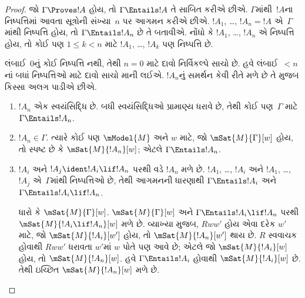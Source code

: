 \begin{proof}
  જો $\Gamma \Proves !A$ હોય, તો $\Gamma \Entails !A$
  તે સાબિત કરીએ છીએ. $\Gamma$માંથી~$!A$ના નિષ્પત્તિમાં
  આવતા સૂત્રોની સંખ્યા~$n$ પર આગમન કરીએ છીએ.
  $!A_1$, \dots, $!A_n = !A$ એ~$\Gamma$માંથી
  નિષ્પત્તિ હોય, તો $\Gamma \Entails !A_n$ છે તે બતાવીએ.
  નોંધો કે $!A_1$, \dots, $!A_n$ એ નિષ્પત્તિ હોય,
  તો કોઈ પણ $1\le k<n$ માટે $!A_1$, \dots, $!A_k$ પણ
  નિષ્પત્તિ છે.
  

  લંબાઈ~$0$નું કોઈ નિષ્પત્તિ નથી, તેથી $n=0$ માટે
  દાવો નિર્વિકલ્પે સાચો છે. હવે લંબાઈ~$<n$નાં બધાં
  નિષ્પત્તિઓ માટે દાવો સાચો માની લઈએ. $!A_n$નું
  સમર્થન કેવી રીતે મળે છે તે મુજબ કિસ્સા અલગ પાડીએ છીએ.

  \begin{enumerate}
  \item $!A_n$ એક સ્વયંસિદ્ધિ છે. બધી સ્વયંસિદ્ધિઓ
    પ્રામાણ્ય ધરાવે છે, તેથી કોઈ પણ~$\Gamma$ માટે
    $\Gamma \Entails !A_n$.
  \item $!A_n \in \Gamma$. ત્યારે કોઈ પણ $\mModel{M}$
    અને $w$ માટે, જો $\mSat{M}{\Gamma}[w]$ હોય, તો
    સ્પષ્ટ છે કે $\mSat{M}{!A_n}[w]$; એટલે
    $\Gamma \Entails !A_n$.
  \item $!A_i$ અને $!A_j \ident !A_i \lif !A_n$ પરથી
    \MP{} વડે $!A_n$ મળે છે. $!A_1$, \dots, $!A_i$
    અને $!A_1$, \dots, $!A_j$ એ~$\Gamma$માંથી
    નિષ્પત્તિઓ છે, તેથી આગમનની ધારણાથી
    $\Gamma \Entails !A_i$ અને
    $\Gamma \Entails !A_i \lif !A_n$.

    ધારો કે $\mSat{M}{\Gamma}[w]$. $\mSat{M}{\Gamma}[w]$
    અને
    $\Gamma \Entails !A_i \lif !A_n$ પરથી
    $\mSat{M}{!A_i \lif !A_n}[w]$ મળે છે. વ્યાખ્યા મુજબ,
    $Rww'$ હોય એવા દરેક $w'$ માટે, જો
    $\mSat{M}{!A_i}[w']$ હોય, તો
    $\mSat{M}{!A_n}[w']$ થાય છે. $R$ સ્વવાચક હોવાથી
    $Rww'$ ધરાવતા $w'$માં $w$ પોતે પણ આવે છે;
    એટલે જો $\mSat{M}{!A_i}[w]$ હોય, તો
    $\mSat{M}{!A_n}[w]$. હવે $\Gamma \Entails !A_i$
    હોવાથી $\mSat{M}{!A_i}[w]$ છે. તેથી ઇચ્છિત
    $\mSat{M}{!A_n}[w]$ મળે છે.
  \end{enumerate}
\end{proof}
\endgroup

\begingroup
\makeatletter{}\makeatother


\label{guunit:OLP-0505}


